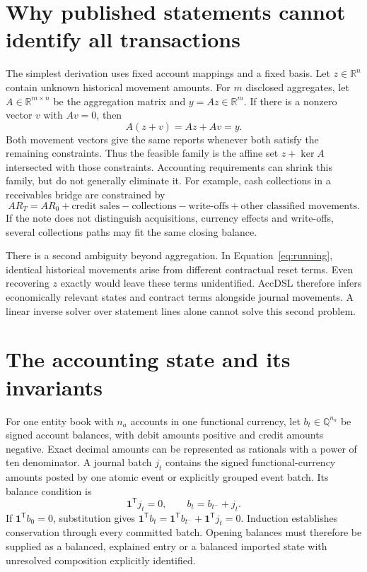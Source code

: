 \section{Why published statements cannot identify all transactions}

The simplest derivation uses fixed account mappings and a fixed basis. Let
$z\in\mathbb{R}^n$ contain unknown historical movement amounts. For $m$
disclosed aggregates, let $A\in\mathbb{R}^{m\times n}$ be the aggregation
matrix and $y=Az\in\mathbb{R}^m$. If there is a nonzero vector $v$ with
$Av=0$, then
\[
 A(z+v)=Az+Av=y.
\]
Both movement vectors give the same reports whenever both satisfy the remaining
constraints. Thus the feasible family is the affine set $z+\ker A$ intersected
with those constraints. Accounting requirements can shrink this family, but
do not generally eliminate it. For example, cash collections in a receivables
bridge are constrained by
\[
 AR_T=AR_0+\text{credit sales}-\text{collections}
       -\text{write-offs}+\text{other classified movements}.
\]
If the note does not distinguish acquisitions, currency effects and write-offs,
several collections paths may fit the same closing balance.

There is a second ambiguity beyond aggregation. In
Equation~\eqref{eq:running}, identical historical movements arise from different
contractual reset terms. Even recovering $z$ exactly would leave these terms
unidentified. AccDSL therefore infers economically relevant states and
contract terms alongside journal movements. A linear inverse solver over
statement lines alone cannot solve this second problem.

\section{The accounting state and its invariants}

For one entity book with $n_a$ accounts in one functional currency, let
$b_t\in\mathbb{Q}^{n_a}$ be
signed account balances, with debit amounts positive and credit amounts
negative. Exact decimal amounts can be represented as rationals with a power
of ten denominator. A journal batch $j_t$ contains the signed functional-currency
amounts posted by one atomic event or explicitly grouped event batch. Its
balance condition is
\begin{equation}\label{eq:posting}
 \boldsymbol{1}^{\mathsf T}j_t=0,\qquad b_t=b_{t^-}+j_t.
\end{equation}
If $\boldsymbol{1}^{\mathsf T}b_0=0$, substitution gives
$\boldsymbol{1}^{\mathsf T}b_t=
\boldsymbol{1}^{\mathsf T}b_{t^-}+\boldsymbol{1}^{\mathsf T}j_t=0$.
Induction establishes conservation through every committed batch. Opening
balances must therefore be supplied as a balanced, explained entry or a
balanced imported state with unresolved composition explicitly identified.

